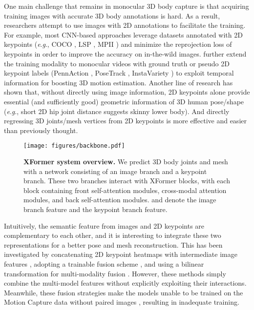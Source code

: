 \documentclass{article}
\newcommand{\eg}{\textit{e}.\textit{g}.}
\begin{document}
One main challenge that remains in monocular 3D body capture is that acquiring training images with accurate 3D body annotations is hard. As a result, researchers attempt to use images with 2D annotations to facilitate the training. For example, most CNN-based approaches  \cite{kanazawa2018endtoend,kolotouros2019learning,mehta2020xnect,kanazawa2019learning,lin2020end} leverage datasets annotated with 2D keypoints (\eg, COCO \cite{lin2014microsoft}, LSP \cite{johnson2010clustered}, MPII \cite{andriluka_mpii2d_cvpr14}) and minimize the reprojection loss of keypoints in order to improve the accuracy on in-the-wild images. \cite{kocabas2019vibe,kanazawa2019learning} further extend the training modality to monocular videos with ground truth or pseudo 2D keypoint labels (PennAction \cite{zhang2013actemes}, PoseTrack \cite{andriluka2018posetrack}, InstaVariety \cite{kanazawa2019learning}) to exploit temporal information for boosting 3D motion estimation. Another line of research \cite{choi2020pose2mesh,martinez2017simple,zhao2019semantic} has shown that, without directly using image information, 2D keypoints alone provide essential (and sufficiently good) geometric information of 3D human pose/shape (\eg, short 2D hip joint distance suggests skinny lower body). And directly regressing 3D joints/mesh vertices from 2D keypoints is more effective and easier than previously thought. 

\begin{figure*}[t]
  \texttt{[image: figures/backbone.pdf]}
  \vspace{-20pt}
  \caption{\textbf{XFormer system overview.} We predict 3D body joints and mesh with a network consisting of an image branch and a keypoint branch. These two branches interact with  XFormer blocks, with each block containing  front self-attention modules,  cross-modal attention modules, and  back self-attention modules.  and  denote the image branch feature and the keypoint branch feature.
  }
  \vspace{-10pt}
  \label{fig:overview}
\end{figure*}

Intuitively, the semantic feature from images and 2D keypoints are complementary to each other, and it is interesting to integrate these two representations for a better pose and mesh reconstruction.
This has been investigated by concatenating 2D keypoint heatmaps with intermediate image features \cite{VNect_SIGGRAPH2017,mehta2020xnect}, adopting a trainable fusion scheme \cite{tekin2017learning}, and using a bilinear transformation for multi-modality fusion \cite{sun2019human}. However, these methods simply combine the multi-model features without explicitly exploiting their interactions. Meanwhile, these fusion strategies make the models unable to be trained on the Motion Capture data without paired images \cite{mahmood2019amass}, resulting in inadequate training.
\end{document}
